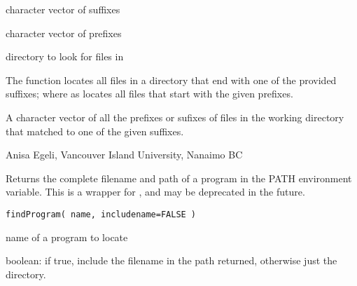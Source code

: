 \documentclass[letterpaper]{book}
\begin{document}
%
\begin{Arguments}
\begin{ldescription}
\item[\code{suffix}] character vector of suffixes
\item[\code{prefix}] character vector of prefixes
\item[\code{path}] directory to look for files in
\end{ldescription}
\end{Arguments}
%
\begin{Details}\relax
The function  locates all files in a directory that end with
one of the provided suffixes; where as  locates all files
that start with the given prefixes.
\end{Details}
%
\begin{Value}
A character vector of all the prefixes or sufixes of files in the working directory that
matched to one of the given suffixes.
\end{Value}
%
\begin{Author}\relax
Anisa Egeli, Vancouver Island University, Nanaimo BC
\end{Author}
%
\begin{Examples}
\end{Examples}
%
\begin{Description}\relax
Returns the complete filename and path of a program in the PATH environment variable.
This is a wrapper for , and may be deprecated in the future.
\end{Description}
%
\begin{Usage}
\begin{verbatim}
findProgram( name, includename=FALSE )
\end{verbatim}
\end{Usage}
%
\begin{Arguments}
\begin{ldescription}
\item[\code{name}] name of a program to locate
\item[\code{includename}] boolean: if true, include the filename in the path returned, otherwise just the directory.
\end{ldescription}
\end{Arguments}
\end{document}
